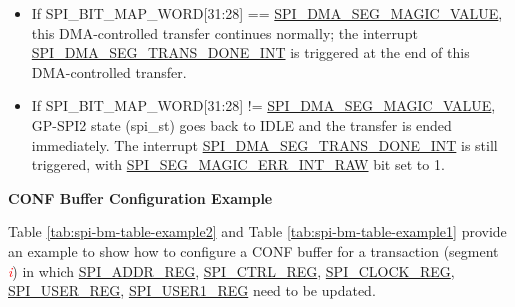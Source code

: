 \documentclass[main\_\_EN.tex]{subfiles}
\begin{document}
    \begin{itemize}
        \item If SPI\_BIT\_MAP\_WORD[31:28] == \hyperref[fielddesc:SPIDMASEGMAGICVALUE]{SPI\_DMA\_SEG\_MAGIC\_VALUE}, this DMA-controlled transfer continues normally; the interrupt \hyperref[int:SPIDMASEGTRANSDONEINT]{SPI\_DMA\_SEG\_TRANS\_DONE\_INT} is triggered at the end of this DMA-controlled transfer.
        \item If SPI\_BIT\_MAP\_WORD[31:28] != \hyperref[fielddesc:SPIDMASEGMAGICVALUE]{SPI\_DMA\_SEG\_MAGIC\_VALUE}, GP-SPI2 state (spi\_st) goes back to IDLE and the transfer is ended immediately. The interrupt \hyperref[int:SPIDMASEGTRANSDONEINT]{SPI\_DMA\_SEG\_TRANS\_DONE\_INT} is still triggered, with \hyperref[fielddesc:SPISEGMAGICERRINTRAW]{SPI\_SEG\_MAGIC\_ERR\_INT\_RAW} bit set to 1.
    \end{itemize}

\textbf{CONF Buffer Configuration Example}\label{sec:spi-sct-conf-buffer-example}

Table \ref{tab:spi-bm-table-example2} and Table \ref{tab:spi-bm-table-example1} provide an example to show how to configure a CONF buffer for a transaction (segment \textcolor{red}{\it i}) in which \hyperref[regdesc:SPIADDRREG]{SPI\_ADDR\_REG}, \hyperref[regdesc:SPICTRLREG]{SPI\_CTRL\_REG}, \hyperref[regdesc:SPICLOCKREG]{SPI\_CLOCK\_REG},
\hyperref[regdesc:SPIUSERREG]{SPI\_USER\_REG},
\hyperref[regdesc:SPIUSER1REG]{SPI\_USER1\_REG} need to be updated.
\end{document}
